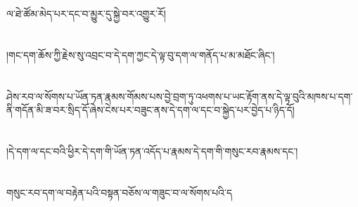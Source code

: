 ལ་ཐེ་ཚོམ་མེད་པར་དང་བ་མྱུར་དུ་སྐྱེ་བར་འགྱུར་རོ།\chapter{ }།གང་དག་ཆོས་ཀྱི་རྗེས་སུ་འབྲང་བ་དེ་དག་ཀྱང་དེ་ལྟ་བུ་དག་ལ་གནོད་པ་མ་མཐོང་ཞིང་།\chapter{ }ཤེས་རབ་ལ་སོགས་པ་ཡོན་ཏན་རྣམས་གོམས་པས་བྱེ་བྲག་ཏུ་འཕགས་པ་ཡང་རྟོག་ནས་དེ་ལྟ་བུའི་མཁས་པ་དག་ནི་གདོན་མི་ཟ་བར་སྲིད་དོ་ཞེས་ངེས་པར་བཟུང་ནས་དེ་དག་ལ་དང་བ་སྐྱེད་པར་བྱེད་པ་ཉིད་དོ།\chapter{ }།དེ་དག་ལ་དང་བའི་ཕྱིར་དེ་དག་གི་ཡོན་ཏན་འདོད་པ་རྣམས་དེ་དག་གི་གསུང་རབ་རྣམས་དང་།\chapter{ }གསུང་རབ་དག་ལ་བརྟེན་པའི་བསྟན་བཅོས་ལ་གཟུང་བ་ལ་སོགས་པའི་ད